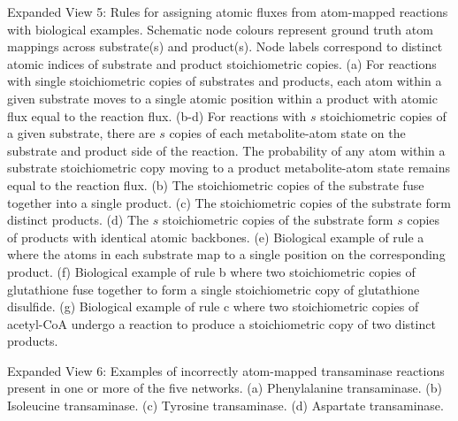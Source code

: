 \documentclass[12pt]{article}
\begin{document}
\noindent Expanded View 5: Rules for assigning atomic fluxes from
atom-mapped reactions with biological examples. Schematic node colours
represent ground truth atom mappings across substrate(s) and product(s).
Node labels correspond to distinct atomic indices of substrate and product
stoichiometric copies.
(a) For reactions with single stoichiometric copies of substrates and
products, each atom within a given substrate moves to a single atomic
position within a product with atomic flux equal to the reaction flux.
(b-d) For reactions with $s$ stoichiometric copies of a given substrate,
there are $s$ copies of each metabolite-atom state on the substrate and
product side of the reaction. The probability of any atom within
a substrate stoichiometric copy moving to a product metabolite-atom state
remains equal to the reaction flux. (b) The stoichiometric copies of the
substrate fuse together into a single product. (c) The stoichiometric
copies of the substrate form distinct products. (d) The $s$ stoichiometric
copies of the substrate form $s$ copies of products with identical atomic
backbones. (e) Biological example of rule a where the atoms in each
substrate map to a single position on the corresponding product. (f)
Biological example of rule b where two stoichiometric copies of
glutathione fuse together to form a single stoichiometric copy of
glutathione disulfide. (g) Biological example of rule c where two
stoichiometric copies of acetyl-CoA undergo a reaction to produce
a stoichiometric copy of two distinct products.

\noindent Expanded View 6: Examples of incorrectly atom-mapped transaminase
reactions present in one or more of the five networks. (a) Phenylalanine
transaminase. (b) Isoleucine transaminase. (c) Tyrosine transaminase. (d)
Aspartate transaminase.
\end{document}
